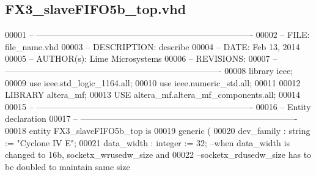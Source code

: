\subsection{F\+X3\+\_\+slave\+F\+I\+F\+O5b\+\_\+top.\+vhd}
\label{FX3__slaveFIFO5b__top_8vhd_source}

\begin{DoxyCode}
00001 \textcolor{keyword}{-- ---------------------------------------------------------------------------- }
00002 \textcolor{keyword}{-- FILE:    file\_name.vhd}
00003 \textcolor{keyword}{-- DESCRIPTION: describe}
00004 \textcolor{keyword}{-- DATE:    Feb 13, 2014}
00005 \textcolor{keyword}{-- AUTHOR(s):   Lime Microsystems}
00006 \textcolor{keyword}{-- REVISIONS:}
00007 \textcolor{keyword}{-- ---------------------------------------------------------------------------- }
00008 \textcolor{vhdlkeyword}{library }\textcolor{keywordflow}{ieee};
00009 \textcolor{vhdlkeyword}{use }ieee.std\_logic\_1164.\textcolor{keywordflow}{all};
00010 \textcolor{vhdlkeyword}{use }ieee.numeric\_std.\textcolor{keywordflow}{all};
00011 
00012 \textcolor{vhdlkeyword}{LIBRARY }\textcolor{keywordflow}{altera\_mf};
00013 \textcolor{vhdlkeyword}{USE }altera\_mf.altera\_mf\_components.\textcolor{keywordflow}{all};
00014 
00015 \textcolor{keyword}{-- ----------------------------------------------------------------------------}
00016 \textcolor{keyword}{-- Entity declaration}
00017 \textcolor{keyword}{-- ----------------------------------------------------------------------------}
00018 \textcolor{keywordflow}{entity }FX3_slaveFIFO5b_top \textcolor{keywordflow}{is}
00019     \textcolor{keywordflow}{generic} \textcolor{vhdlchar}{(}
00020                 \textcolor{vhdlchar}{dev_family}              \textcolor{vhdlchar}{:} \textcolor{comment}{string} \textcolor{vhdlchar}{:=} \textcolor{keyword}{"Cyclone IV E"};
00021                 \textcolor{vhdlchar}{data_width}              \textcolor{vhdlchar}{:} \textcolor{comment}{integer} \textcolor{vhdlchar}{:=} \textcolor{vhdllogic}{}\textcolor{vhdllogic}{32};\textcolor{keyword}{                                --when data\_width
       is changed to 16b, socketx\_wrusedw\_size and }
00022 \textcolor{keyword}{                                                                                                
      --socketx\_rdusedw\_size has to be doubled to maintain same size}

\end{DoxyCode}
